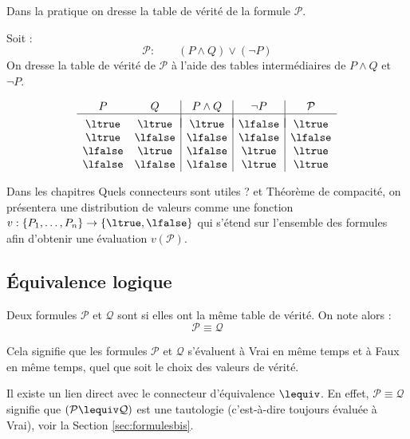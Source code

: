 \documentclass[11pt,class=report,crop=false]{standalone}
\begin{document}
Dans la pratique on dresse la table de vérité de la formule $\mathcal{P}$.

\begin{exemple}
Soit :
\[
\mathcal{P} : \qquad (P \land Q) \lor (\lnot P)
\]
On dresse la table de vérité de $\mathcal{P}$ à l'aide des tables intermédiaires de $P \land Q$ et $\lnot P$.

\[
\begin{array}{c c | c | c | c}
	P		& Q 		& P \land Q 	& \lnot P 	&  \mathcal{P} \\
	\hline
	&&&&	\\[-2ex]
	\ltrue 	& \ltrue 	& \ltrue		& \lfalse 	& \ltrue \\
	\ltrue 	& \lfalse 	& \lfalse		& \lfalse	& \lfalse \\
	\lfalse & \ltrue 	& \lfalse		& \ltrue	& \ltrue \\	
	\lfalse & \lfalse 	& \lfalse 		& \ltrue	& \ltrue \\		
\end{array}
\]

\end{exemple}

Dans les chapitres \og{}Quels connecteurs sont utiles ?\fg{} et \og{}Théorème de compacité\fg{}, on présentera une distribution de valeurs comme une fonction $v : \{P_1,\ldots,P_n\} \to \{ \ltrue, \lfalse \}$ qui s'étend sur l'ensemble des formules afin d'obtenir une évaluation $v(\mathcal{P})$.


\subsection{Équivalence logique}

\begin{definition}
	Deux formules $\mathcal{P}$ et $\mathcal{Q}$ sont  si elles ont la même table de vérité. On note alors :
	\[ \mathcal{P} \equiv \mathcal{Q} \]
\end{definition}
Cela signifie que les formules $\mathcal{P}$ et $\mathcal{Q}$ s'évaluent à Vrai en même temps et à Faux en même temps, quel que soit le choix des valeurs de vérité.

Il existe un lien direct avec le connecteur d'équivalence $\lequiv$. En effet, $\mathcal{P} \equiv \mathcal{Q}$ signifie que $(\mathcal{P} \lequiv \mathcal{Q})$ est une tautologie (c'est-à-dire toujours évaluée à Vrai), voir la Section \ref{sec:formulesbis}.
\end{document}
